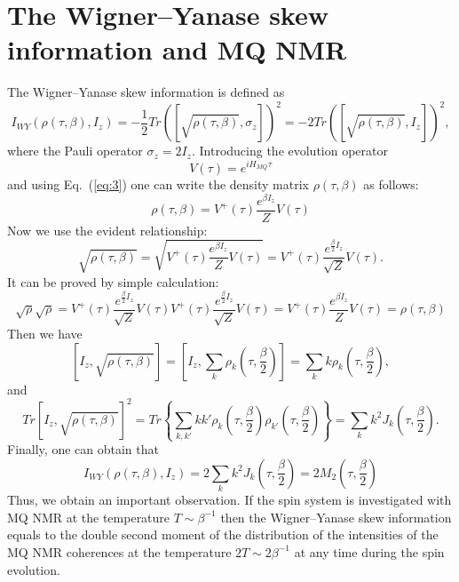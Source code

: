 \documentclass[preprint,12pt]{elsarticle}
\begin{document}
\section{The Wigner--Yanase skew information and MQ NMR}
\label{sec:3}
The Wigner--Yanase skew information is defined as~\cite{1,2,3,4}
\begin{equation}
    \label{eq:14}
        I_{WY}(\rho(\tau,\beta),I_z) = -\frac{1}{2}
            Tr([\sqrt{\rho(\tau,\beta)},\sigma_z])^2 =
                -2Tr([\sqrt{\rho(\tau,\beta)},I_z])^2,
\end{equation}
where the Pauli operator $\sigma_z=2I_z$.
Introducing the evolution operator
\begin{equation}
    \label{eq:15}
        V(\tau) = e^{iH_{MQ}\tau}
\end{equation}
and using Eq.~(\ref{eq:3}) one can write the density matrix $\rho(\tau,\beta)$ as follows:
\begin{equation}
    \label{eq:16}
        \rho(\tau,\beta) = V^+(\tau) \frac{e^{\beta I_z}}{Z}V(\tau)
\end{equation}
Now we use the evident relationship:
\begin{equation}
    \label{eq:17}
        \sqrt{\rho(\tau,\beta)} =
            \sqrt{V^+(\tau)\frac{e^{\beta I_z}}{Z}V(\tau)} =
                V^+(\tau) \frac{e^{\frac{\beta}{2}I_z}}{\sqrt{Z}}V(\tau).
\end{equation}
It can be proved by simple calculation:
\begin{equation}
    \label{eq:18}
        \sqrt{\rho}\sqrt{\rho} =
						V^+(\tau)\frac{e^{\frac{\beta}{2}I_z}}{\sqrt{Z}}
                V(\tau)V^+(\tau)\frac{e^{\frac{\beta}{2}I_z}}{\sqrt{Z}}V(\tau) =
						V^+(\tau)\frac{e^{\beta I_z}}{Z}V(\tau) =
        \rho(\tau,\beta)
\end{equation}
%
Then we have
%
\begin{equation} \label{eq:19}
    \left[I_z,\sqrt{\rho(\tau,\beta)}\right]
    = \left[I_z, \sum_k \rho_k \left(\tau, \frac{\beta}{2}\right)\right]
    = \sum_k k\rho_k \left(\tau, \frac{\beta}{2}\right),
\end{equation}
%
and
%
\begin{equation} \label{eq:20}
	Tr\left[I_z,\sqrt{\rho(\tau,\beta)} \right]^2
	= Tr\left\{\sum_{k,k'}kk'
		\rho_k\left(\tau,\frac{\beta}{2}\right)
		\rho_{k'}\left(\tau,\frac{\beta}{2}\right)
	\right\}
	= \sum_k k^2 J_k\left(\tau,\frac{\beta}{2}\right).
\end{equation}
%
Finally, one can obtain that
%
\begin{equation} \label{eq:21}
    I_{WY}\left(\rho(\tau, \beta), I_z\right)
    = 2\sum_k k^2 J_k\left(\tau, \frac{\beta}{2}\right)
    = 2M_2\left(\tau, \frac{\beta}{2}\right)
\end{equation}
%
Thus, we obtain an important observation.
If the spin system is investigated with MQ NMR at the temperature $T\sim\beta^{-1}$ then the Wigner--Yanase skew information equals to the double second moment of the distribution of the intensities of the MQ NMR coherences at the temperature $2T \sim 2\beta^{-1}$ at any time during the spin evolution.
\end{document}
